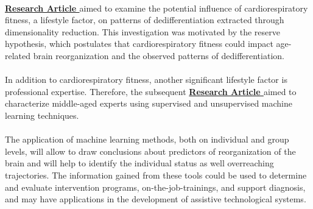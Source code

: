 \\
\textbf{\hyperref[pb:paperIII]{Research Article }} aimed to examine the potential influence of cardiorespiratory fitness, a lifestyle factor, on patterns of dedifferentiation extracted through dimensionality reduction. This investigation was motivated by the reserve hypothesis, which postulates that cardiorespiratory fitness could impact age-related brain reorganization and the observed patterns of dedifferentiation.\\
\\
In addition to cardiorespiratory fitness, another significant lifestyle factor is professional expertise. Therefore, the subsequent \textbf{\hyperref[paperIV]{Research Article }} aimed to characterize middle-aged experts using supervised and unsupervised machine learning techniques.\\
\\
The application of machine learning methods, both on individual and group levels, will allow to draw conclusions about predictors of reorganization of the brain and will help to identify the individual status as well overreaching trajectories. The information gained from these tools could be used to determine and evaluate intervention programs, on-the-job-trainings, and support diagnosis, and may have applications in the development of assistive technological systems. 